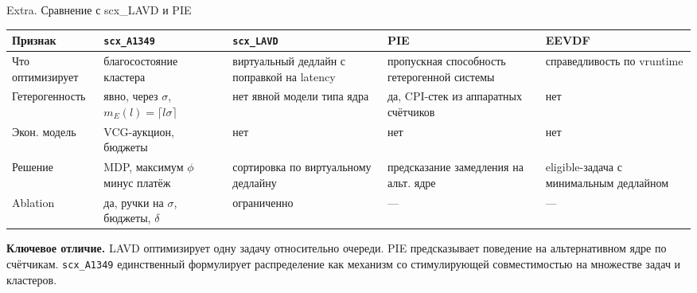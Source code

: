 \documentclass[aspectratio=169,11pt]{beamer}
\begin{document}
\begin{frame}{Extra. Сравнение с scx\_LAVD и PIE}
        \tiny
        \begin{tabular}{|p{1.7cm}|p{1.9cm}|p{1.9cm}|p{1.9cm}|p{1.7cm}|}
                \hline
                Признак & \texttt{scx\_A1349} & \texttt{scx\_LAVD} & PIE & EEVDF \\
                \hline
                Что оптимизирует
                        & благосостояние кластера
                        & виртуальный дедлайн с поправкой на latency
                        & пропускная способность гетерогенной системы
                        & справедливость по vruntime \\
                \hline
                Гетерогенность
                        & явно, через $\sigma$, $m_E(l)=\lceil l\sigma\rceil$
                        & нет явной модели типа ядра
                        & да, CPI-стек из аппаратных счётчиков
                        & нет \\
                \hline
                Экон. модель
                        & VCG-аукцион, бюджеты
                        & нет
                        & нет
                        & нет \\
                \hline
                Решение
                        & MDP, максимум $\phi$ минус платёж
                        & сортировка по виртуальному дедлайну
                        & предсказание замедления на альт. ядре
                        & eligible-задача с минимальным дедлайном \\
                \hline
                Ablation
                        & да, ручки на $\sigma$, бюджеты, $\delta$
                        & ограниченно
                        & ---
                        & --- \\
                \hline
        \end{tabular}

        \vspace{0.15cm}
        \begin{shadowbox2}
                \scriptsize
                \textbf{Ключевое отличие.} LAVD оптимизирует одну
                задачу относительно очереди. PIE предсказывает поведение
                на альтернативном ядре по счётчикам.
                \texttt{scx\_A1349} единственный формулирует
                распределение как механизм со стимулирующей
                совместимостью на множестве задач и кластеров.
        \end{shadowbox2}
\end{frame}
\addtocounter{framenumber}{-1}
\end{document}
